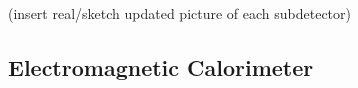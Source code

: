 (insert real/sketch updated picture of each subdetector)  

\subsection{Electromagnetic Calorimeter}

